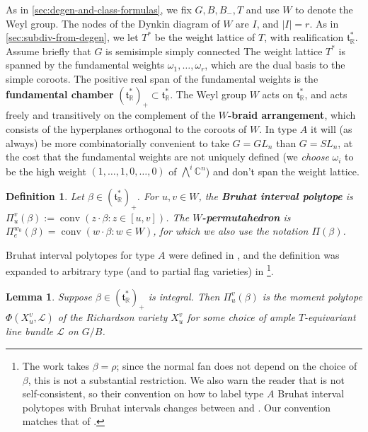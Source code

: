 \documentclass[10pt,a4paper]{amsart}
\newtheorem{lemma}[Thm]{Lemma}
\newtheorem{definition}[Thm]{Definition}
\newcommand{\RR}{\mathbb{R}}
\newcommand{\CC}{\mathbb{C}}
\newcommand\defn[1]{{\bf #1}}
\def\pt{\beta}
\def\BB{{(\lie{t}_\RR^*)_+}}
\newcommand\lie[1]{{\mathfrak #1}}
\newcommand\calL{{\mathcal L}}
\DeclareMathOperator{\conv}{conv}
\begin{document}
\renewcommand\BB{{(\lie t_\RR^*)_+}}

As in \cref{sec:degen-and-class-formulas}, we fix $G, B, B_-, T$ and
use $W$ to denote the Weyl group. The nodes of the Dynkin diagram of
$W$ are $I$, and $|I|=r$. As in \cref{sec:subdiv-from-degen},
we let $T^*$ be the weight lattice of $T$, with realification $\lie t_\RR^*$.
Assume briefly that $G$ is semisimple simply connected
The weight lattice $T^*$ is spanned by the fundamental weights
$\omega_1, \dots, \omega_r$, which are the dual basis to the simple
coroots. The positive real span of the fundamental weights is the
\defn{fundamental chamber} $\BB \subset \lie t_\RR^*$. The Weyl group
$W$ acts on $\lie t_\RR^*$, and acts freely and transitively on the
complement of the \defn{$W$-braid arrangement}, which consists of the
hyperplanes orthogonal to the coroots of $W$. In type $A$ it will (as always) be more combinatorially convenient to
take $G = GL_n$ than $G = SL_n$, at the cost that the fundamental weights are
not uniquely defined (we {\em choose} $\omega_i$ to be the high weight
$(1,\ldots,1,0,\ldots,0)$ of $\bigwedge^i \CC^n$) and don't span the weight lattice.

\begin{definition}\label{def:BIP-general-type}
	Let $\pt \in \BB$. For $u, v \in W$, the \defn{Bruhat interval polytope} is $\Pi_u^v(\pt):= \conv(z \cdot \pt: z \in [u,v])$. The \defn{$W$-permutahedron} is $\Pi_e^{w_0}(\pt)= \conv(w \cdot \pt: w \in W)$, for which we also use the notation $\Pi(\pt)$. 
\end{definition}

Bruhat interval polytopes for type $A$ were defined in \cite{KW15}, and the definition was expanded to arbitrary type (and to partial flag varieties) in \cite{TW15}\footnote{The work \cite{TW15} takes $\pt=\rho$; since the normal fan does not depend on the choice of $\pt$, this is not a substantial restriction. We also warn the reader that \cite{TW15} is not self-consistent, so their convention on how to label type $A$ Bruhat interval polytopes with Bruhat intervals changes between \cite[Definition 2.2]{TW15} and \cite[Definition 7.8]{TW15}. Our convention matches that of \cite[Definition 7.8]{TW15}.}.

\begin{lemma}\label{lem:BIP-moment-polytope}
	Suppose $\pt \in \BB$ is integral. Then  $\Pi_u^v(\pt)$ is the moment polytope $\Phi(X_u^v, \calL)$ of the Richardson variety $X_u^v$ for some choice of ample $T$-equivariant line bundle $\calL$ on $G/B$. 
\end{lemma}
\end{document}
